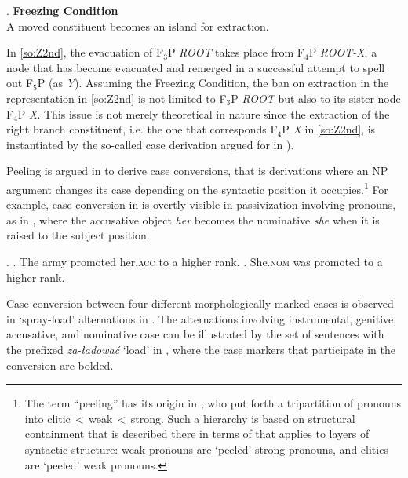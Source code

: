 \ex.\label{freezing} \textbf{Freezing Condition}\\[0.5ex]
A moved constituent becomes an island for extraction. 

 In \ref{so:Z2nd}, the evacuation of F$_{3}$P \textit{ROOT} takes place from F$_{4}$P \textit{ROOT-X}, a node that has become evacuated and remerged in a successful attempt to spell out F$_{5}$P (as \textit{Y}). 
Assuming the Freezing Condition, the ban on extraction in the representation in \ref{so:Z2nd} is not limited to F$_{3}$P \textit{ROOT} but also to its sister node F$_{4}$P \textit{X}. This issue is not merely theoretical in nature since the extraction of the right branch constituent, i.e. the one that corresponds F$_{4}$P \textit{X} in \ref{so:Z2nd}, is instantiated by the so-called case  derivation argued for in \citet[\S4]{Caha2009}).
\par
Peeling is argued in \citet[\S4]{Caha2009} to derive case conversions, that is derivations where an NP argument changes its case depending on the syntactic position it occupies.\footnote{The term ``peeling'' has its origin in \citet[195]{Cardinaletti-Starke1999}, who put forth a tripartition of pronouns into clitic\,$<$\,weak\,$<$\,strong. Such a hierarchy is based on structural containment that is described there in terms of  that applies to layers of syntactic structure: weak pronouns are `peeled' strong pronouns, and clitics are `peeled' weak pronouns. 
} %
 For example, case conversion in  is overtly visible in passivization involving pronouns, as in \Next, where the accusative object \textit{her} becomes the nominative \textit{she} when it is raised to the subject position.

\ex. 
\a. The army promoted her.\textsc{acc} to a higher rank.
\b. She.\textsc{nom} was promoted to a higher rank.

Case conversion between four different morphologically marked cases is observed in `spray-load' alternations in . The alternations involving instrumental, genitive, accusative, and nominative case can be illustrated by the set of sentences with the  prefixed  \textit{za-\l{}adowa\'c} `load' in \Next, where the case markers that participate in the conversion are bolded. 


